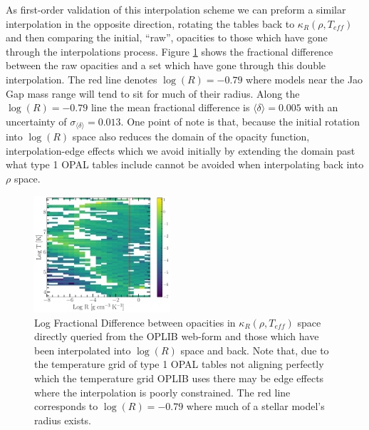 As first-order validation of this interpolation scheme we can preform a similar
interpolation in the opposite direction, rotating the tables back to
$\kappa_{R}(\rho, T_{eff})$ and then comparing the initial, ``raw'', opacities
to those which have gone through the interpolations process. Figure
\ref{fig:fracdiff} shows the fractional difference between the raw opacities
and a set which have gone through this double interpolation. The red line
denotes $\log(R)=-0.79$ where models near the Jao Gap mass range will
tend to sit for much of their radius. Along the $\log(R)=-0.79$ line the mean
fractional difference is $\langle \delta \rangle = 0.005$ with an uncertainty of
$\sigma_{\langle\delta\rangle} = 0.013$. One point of note is that, because the
initial rotation into $\log(R)$ space also reduces the domain of the opacity
function, interpolation-edge effects which we avoid initially by extending the
domain past what type 1 OPAL tables include cannot be avoided when
interpolating back into $\rho$ space. 

\begin{figure}
	\centering
	\includegraphics[width=0.45\textwidth]{figures/jaoOpacity/FractionalDifference.pdf}
	\caption{Log Fractional Difference between opacities in $\kappa_{R}(\rho,
	T_{eff})$ space directly queried from the OPLIB web-form and those which
	have been interpolated into $\log(R)$ space and back. Note that, due to the
	temperature grid of type 1 OPAL tables not aligning perfectly which the temperature
	grid OPLIB uses there may be edge effects where the interpolation is poorly
	constrained. The red line corresponds to $\log(R) = -0.79$ where much of a
	stellar model's radius exists.}
	\label{fig:fracdiff}
\end{figure}

